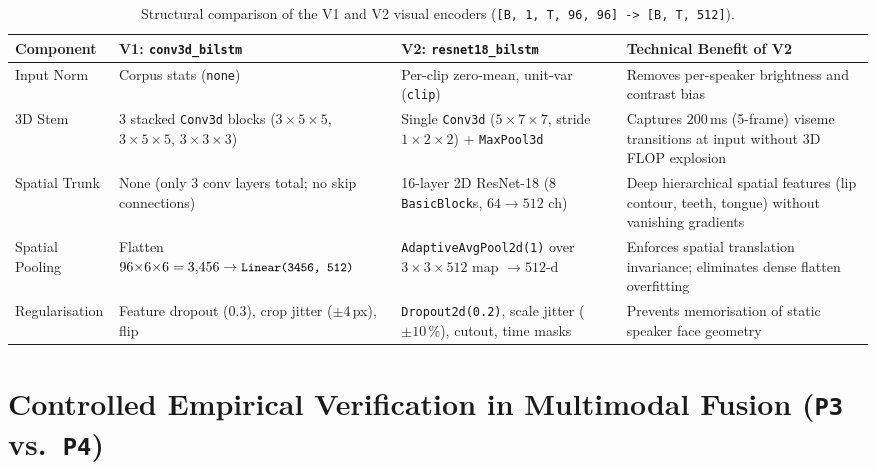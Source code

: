 \documentclass[11pt,a4paper]{article}
\newcommand{\code}[1]{\texttt{\small #1}}
\begin{document}
\begin{table}[htbp]
\centering\small
\caption{Structural comparison of the V1 and V2 visual encoders (\code{[B, 1, T, 96, 96] -> [B, T, 512]}).}
\label{tab:arch}
\begin{tabularx}{\textwidth}{@{}L{2.8cm}L{4.2cm}L{4.5cm}X@{}}
\toprule
{}\sffamily\bfseries Component & \sffamily\bfseries V1: \code{conv3d\_bilstm} & \sffamily\bfseries V2: \code{resnet18\_bilstm} & \sffamily\bfseries Technical Benefit of V2 \\
\midrule
Input Norm & Corpus stats (\code{none}) & Per-clip zero-mean, unit-var (\code{clip}) & Removes per-speaker brightness and contrast bias \\
3D Stem & 3 stacked \code{Conv3d} blocks ($3{\times}5{\times}5$, $3{\times}5{\times}5$, $3{\times}3{\times}3$) & Single \code{Conv3d} ($5{\times}7{\times}7$, stride $1{\times}2{\times}2$) + \code{MaxPool3d} & Captures $200$\,ms (5-frame) viseme transitions at input without 3D FLOP explosion \\
Spatial Trunk & None (only 3 conv layers total; no skip connections) & 16-layer 2D ResNet-18 (8 \code{BasicBlock}s, $64{\to}512$ ch) & Deep hierarchical spatial features (lip contour, teeth, tongue) without vanishing gradients \\
Spatial Pooling & Flatten $96{\times}6{\times}6 = 3{,}456 \to \code{Linear(3456, 512)}$ & \code{AdaptiveAvgPool2d(1)} over $3{\times}3{\times}512$ map $\to 512$-d & Enforces spatial translation invariance; eliminates dense flatten overfitting \\
Regularisation & Feature dropout ($0.3$), crop jitter ($\pm 4$\,px), flip & \code{Dropout2d(0.2)}, scale jitter ($\pm 10\,\%$), cutout, time masks & Prevents memorisation of static speaker face geometry \\
\bottomrule
\end{tabularx}
\end{table}

\section{Controlled Empirical Verification in Multimodal Fusion (\code{P3} vs.\ \code{P4})}
\end{document}

